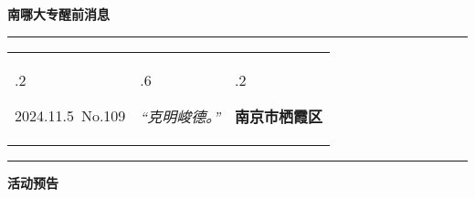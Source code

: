 \documentclass[letterpaper, 12pt]{article}
\begin{document}
\begin{center}
    \Huge\textbf{南哪大专醒前消息}
\end{center}
\vspace{4mm}
\hrule
\renewcommand\tabularxcolumn[1]{m{#1}}
\begin{tabularx}{\textwidth}{>{\hsize.2\hsize}X>{\hsize.6\hsize}X>{\hsize.2\hsize}X}
    \begin{flushleft}
        2024.11.5\, No.109
    \end{flushleft}
    &
    \begin{center}
        \textit{“克明峻德。”}
    \end{center}
    &
    \begin{flushright}
        \textbf{南京市栖霞区}
    \end{flushright}
\end{tabularx}
\vspace{-3.5mm}
\hrule
\vspace{4mm}
\centerline{\huge\textbf{活动预告}}
\end{document}
